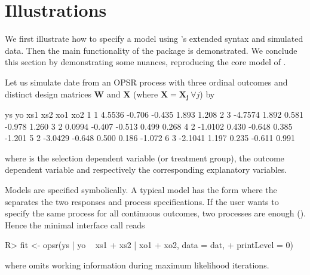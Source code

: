 \documentclass[%
    twoside, openright, titlepage, numbers=noenddot,%
    cleardoublepage=empty,%
    abstract=false,%
    BCOR=5.5mm, paper=a5, fontsize=10pt,%
]{scrreprt}
\begin{document}
\section{Illustrations} \label{sec:illustrations}

We first illustrate how to specify a model using 's extended syntax and simulated data. Then the main functionality of the package is demonstrated. We conclude this section by demonstrating some nuances, reproducing the core model of \cite{Wang+Mokhtarian:2024}.

Let us simulate date from an OPSR process with three ordinal outcomes and distinct design matrices $\boldsymbol{W}$ and $\boldsymbol{X}$ (where $\boldsymbol{X} = \boldsymbol{X_j} \ \forall{j}$) by
%
\begin{Schunk}
\begin{Soutput}
  ys      yo    xs1    xs2    xo1    xo2
1  1  4.5536 -0.706 -0.435  1.893  1.208
2  3 -4.7574  1.892  0.581 -0.978  1.260
3  2  0.0994 -0.407 -0.513  0.499  0.268
4  2 -1.0102  0.430 -0.648  0.385 -1.201
5  2 -3.0429 -0.648  0.500  0.186 -1.072
6  3 -2.1041  1.197  0.235 -0.611  0.991
\end{Soutput}
\end{Schunk}
%
where  is the selection dependent variable (or treatment group),  the outcome dependent variable and  respectively  the corresponding explanatory variables.

Models are specified symbolically. A typical model has the form  where the \code{|} separates the two responses and process specifications. If the user wants to specify the same process for all continuous outcomes, two processes are enough (). Hence the minimal  interface call reads
%
\begin{Schunk}
\begin{Sinput}
R> fit <- opsr(ys | yo ~ xs1 + xs2 | xo1 + xo2, data = dat,
+    printLevel = 0)
\end{Sinput}
\end{Schunk}
%
where  omits working information during maximum likelihood iterations.
\end{document}
